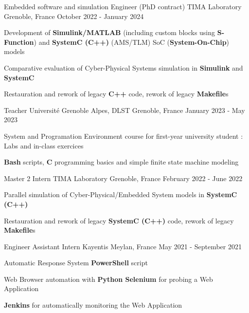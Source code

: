 \begin{cventries}
	\cventry
	{Embedded software and simulation Engineer (PhD contract)} %
	{TIMA Laboratory} %
	{Grenoble, France} %
	{October 2022 - January 2024} %
	{
		\begin{cvitems} %
		\item{Development of \textbf{Simulink/MATLAB} (including custom blocks using \textbf{S-Function}) and \textbf{SystemC (C++)} (AMS/TLM) SoC (\textbf{System-On-Chip}) models}
		\item{Comparative evaluation of Cyber-Physical Systems simulation in \textbf{Simulink} and \textbf{SystemC}}
		\item{Restauration and rework of legacy \textbf{C++} code, rework of legacy \textbf{Makefile}s}
		\end{cvitems}
	}

	\cventry
	{Teacher} %
	{Université Grenoble Alpes, DLST} %
	{Grenoble, France} %
	{January 2023 - May 2023} %
	{
		\begin{cvitems} %
		\item{System and Programation Environment course for first-year university student : Labs and in-class exercices}
		\item{\textbf{Bash} scripts, \textbf{C} programming basics and simple finite state machine modeling}
		\end{cvitems}
	}

	\cventry
	{Master 2 Intern} %
	{TIMA Laboratory} %
	{Grenoble, France} %
	{February 2022 - June 2022} %
	{
		\begin{cvitems} %
		\item{Parallel simulation of Cyber-Physical/Embedded System models in \textbf{SystemC (C++)}}
		\item {Restauration and rework of legacy \textbf{SystemC (C++)} code, rework of legacy \textbf{Makefile}s}		
		\end{cvitems}
	}

	\cventry
	{Engineer Assistant Intern} %
	{Kayentis} %
	{Meylan, France} %
	{May 2021 - September 2021} %
	{
		\begin{cvitems} %
		\item {Automatic Response System \textbf{PowerShell} script}
		\item {Web Browser automation with \textbf{Python Selenium} for probing a Web Application}
		\item {\textbf{Jenkins} for automatically monitoring the Web Application}
		\end{cvitems}
	}


\end{cventries}
